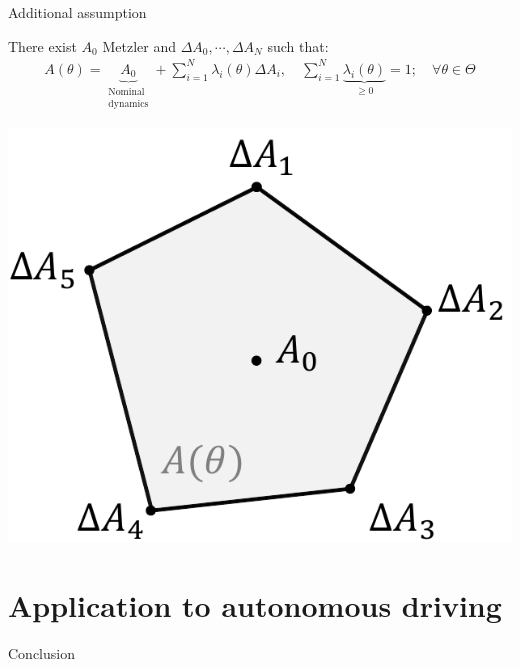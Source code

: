 \documentclass[slideopt,A4,showboxes,svgnames]{beamer}
\begin{document}
\begin{frame}{Additional assumption}
\begin{assumption}
	\label{ass:a3} There exist $A_{0}$ \alert{Metzler} and $\Delta A_{0}, \cdots, \Delta A_{N}$ such that:
	\begin{gather*}
	A(\theta)=\underbrace{A_{0}}_{\substack{\text{Nominal}\\\text{dynamics}}} + \sum_{i=1}^{N}\lambda_{i}(\theta)\Delta A_{i},\quad \sum_{i=1}^{N}\underbrace{\lambda_{i}(\theta)}_{\geq 0}=1;\quad \forall\theta\in\Theta
	\end{gather*}
\end{assumption}
\centering
\includegraphics[width=0.42\linewidth]{img/polytope}
\end{frame}



\section{Application to autonomous driving}


 \frame{\sectionpage}

\begin{frame}{Conclusion}
 
\end{frame}
\end{document}
